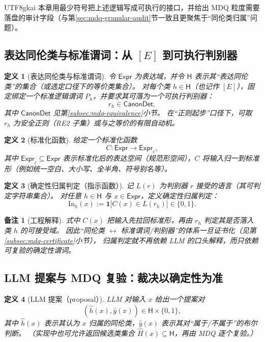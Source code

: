 \documentclass[12pt]{article}
\newtheorem{definition}{定义}[section]
\newtheorem{remark}{备注}[section]
\begin{document}
\begin{CJK*}{UTF8}{gkai}
本章用最少符号把上述逻辑写成可执行的接口，并给出 MDQ 粒度需要落盘的审计字段（与第\ref{sec:mdq-granular-audit}节一致且更聚焦于“同伦类归属”问题）。

\subsection{表达同伦类与标准谓词：从 \texorpdfstring{$[E]$}{[E]} 到可执行判别器}
\label{subsec:homotopy-class-predicate}

\begin{definition}[表达同伦类与标准谓词]
令 $\mathsf{Expr}$ 为表达域，并令 $\mathsf{H}$ 表示其“表达同伦类”的集合（或选定口径下的等价类集合）。
对每个类 $h\in\mathsf{H}$（也记作 $[E]$），固定绑定一个标准逻辑谓词 $P_h$，并要求其可落为一个可执行判别器：
\[
r_h\in \mathsf{CanonDet},
\]
其中 $\mathsf{CanonDet}$ 见第\ref{subsec:mdq-equivalence}小节。
在“正则起步”口径下，可取 $r_h$ 为安全正则（\textsf{RE2} 子集）或与之等价的有限自动机。
\end{definition}

\begin{definition}[标准化函数]
给定一个标准化函数
\[
C:\mathsf{Expr}\to \mathsf{Expr}_c,
\]
其中 $\mathsf{Expr}_c\subseteq \mathsf{Expr}$ 表示标准化后的表达空间（规范形空间），$C$ 将输入归一到标准形（例如统一空白、大小写、全半角、符号别名等）。
\end{definition}

\begin{definition}[确定性归属判定（指示函数）]
记 $L(r)$ 为判别器 $r$ 接受的语言（其可判定字符串集合）。
对任意 $h\in\mathsf{H}$ 与 $x\in\mathsf{Expr}$，定义确定性归属判定：
\[
\mathrm{In}_h(x):=\mathbf{1}\bigl[C(x)\in L(r_h)\bigr]\in\{0,1\}.
\]
\end{definition}

\begin{remark}[工程解释]
式中 $C(x)$ 把输入先拉回标准形，再由 $r_h$ 判定其是否落入类 $h$ 的可接受域。
因此“同伦类 $\leftrightarrow$ 标准谓词/判别器”的体系一旦证书化（见第\ref{subsec:mdq-certificate}小节），
归属判定就不再依赖 LLM 的口头解释，而只依赖可复验的确定性谓词。
\end{remark}

\subsection{LLM 提案与 MDQ 复验：裁决以确定性为准}
\label{subsec:proposal-vs-verification}

\begin{definition}[LLM 提案（proposal）]
LLM 对输入 $x$ 给出一个提案对
\[
(\hat{h}(x),\hat{y}(x))\in \mathsf{H}\times\{0,1\},
\]
其中 $\hat{h}(x)$ 表示其认为 $x$ 归属的同伦类，$\hat{y}(x)$ 表示其对“属于/不属于”的布尔判断。
（实现中也可允许返回候选类集合 $\widehat{H}(x)\subseteq\mathsf{H}$，再由 MDQ 逐个复验。）
\end{definition}


\end{CJK*}
\end{document}
